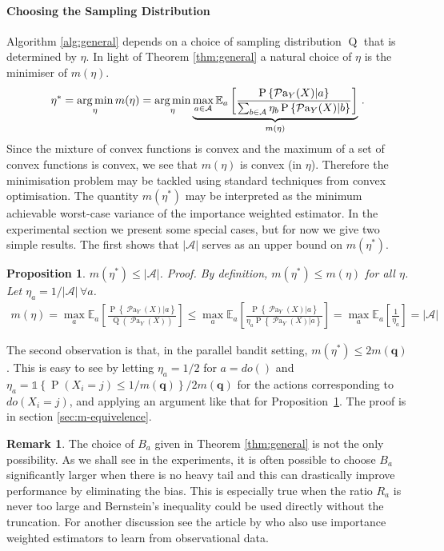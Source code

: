 \documentclass[11pt,a4paper,oneside]{book}
\newcommand{\Q}[1]{\operatorname{Q}\left(#1\right)}
\newcommand{\EE}{\mathbb E}
\newcommand{\EEa}{\EE_a}
\newcommand{\Pn}[2]{\operatorname{P}\left\{#2|#1\right\}}
\newcommand{\calA}{\mathcal A}
\newcommand{\set}[1]{\left\{#1\right\}}
\newcommand{\ind}[1]{\mathds{1}\!\!\set{#1}}
\newcommand{\argmin}{\operatornamewithlimits{arg\,min}}
\newcommand{\eq}[1]{\begin{align*}#1\end{align*}}
\renewcommand{\P}[1]{\operatorname{P}\left(#1\right)}
\newcommand{\parents}[1]{\operatorname{\mathcal{P}a}_{#1}}
\theoremstyle{plain}
\newtheorem{proposition}[theorem]{Proposition}
\theoremstyle{definition}
\newtheorem{remark}[theorem]{Remark}
\begin{document}
\paragraph{Choosing the Sampling Distribution} Algorithm \ref{alg:general} depends on a choice of sampling distribution $\operatorname{Q}$ that is determined by $\eta$. In light of Theorem \ref{thm:general}
a natural choice of $\eta$ is the minimiser of $m(\eta)$.
\eq{
\eta^* 
= \argmin_\eta m(\eta) = \argmin_\eta \underbrace{\max_{a \in \calA} \EEa \left[\frac{\Pn{a}{\parents{Y}(X)}}{\sum_{b \in \calA} \eta_b \Pn{b}{\parents{Y}(X)}}\right]}_{m(\eta)}\,.
}
Since the mixture of convex functions is convex and the maximum of a set of convex functions is convex, we see that $m(\eta)$ is convex (in $\eta$).
Therefore the minimisation problem may be tackled using standard techniques from convex optimisation. The quantity $m(\eta^*)$ may be interpreted as the minimum achievable worst-case variance of the importance weighted estimator. In the experimental section we present some special cases, but for now we give two simple results. The first shows that $|\calA|$ serves as an upper bound on $m(\eta^*)$.

\begin{proposition}\label{pro:m-bound}
$m(\eta^*) \leq |\calA|$. \textit{Proof.} 
\textup{By definition, $m(\eta^*) \leq m(\eta)$ for all $\eta$. Let $\eta_a = 1/|\calA|\,\forall a$.}
\eq{
m(\eta) 
= \max_a \EEa\left[\frac{\Pn{a}{\parents{Y}(X)}}{\Q{\parents{Y}(X)}}\right] 
\leq \max_a \EEa\left[\frac{\Pn{a}{\parents{Y}(X)}}{\eta_a \Pn{a}{\parents{Y}(X)}}\right] 
= \max_a \EEa\left[\frac{1}{\eta_a}\right] = |\calA| %
}
\end{proposition} 

The second observation is that, in the parallel bandit setting, $m(\eta^*) \leq 2m(\boldsymbol{q})$. This is easy to see by letting $\eta_a = 1/2$ for $a = do()$ and $\eta_a = \ind{\P{X_i = j} \leq 1/m(\boldsymbol{q})} / 2m(\boldsymbol{q})$ for the actions corresponding to $do(X_i=j)$, and applying an argument like that for Proposition~\ref{pro:m-bound}. The proof is in section \ref{sec:m-equivelence}.

\begin{remark}\label{rem:truncate}
The choice of $B_a$ given in Theorem \ref{thm:general} is not the only possibility. As we shall see in the experiments, it is 
often possible to choose $B_a$ significantly
larger when there is no heavy tail and this can drastically improve performance by eliminating the bias. This is especially true when the ratio $R_a$ is never too large
and Bernstein's inequality could be used directly without the truncation. For another discussion see the article by \citet{Bottou2013} who also use importance weighted estimators
to learn from observational data.
\end{remark}
\end{document}
